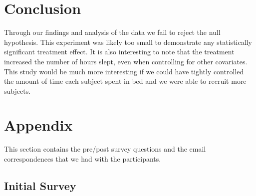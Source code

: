 \documentclass[12pt,]{article}
\begin{document}
\hypertarget{conclusion}{%
\section{Conclusion}\label{conclusion}}

Through our findings and analysis of the data we fail to reject the null
hypothesis. This experiment was likely too small to demonstrate any
statistically significant treatment effect. It is also interesting to
note that the treatment increased the number of hours slept, even when
controlling for other covariates. This study would be much more
interesting if we could have tightly controlled the amount of time each
subject spent in bed and we were able to recruit more subjects.

\hypertarget{appendix}{%
\section{Appendix}\label{appendix}}

This section contains the pre/post survey questions and the email
correspondences that we had with the participants.

\hypertarget{initial-survey}{%
\subsection{Initial Survey}\label{initial-survey}}
\end{document}
